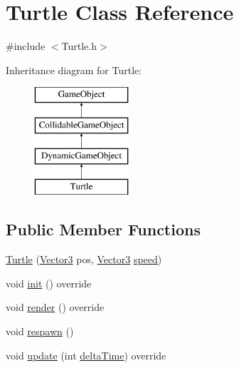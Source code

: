 \hypertarget{class_turtle}{}\section{Turtle Class Reference}
\label{class_turtle}


{\ttfamily \#include $<$Turtle.\+h$>$}

Inheritance diagram for Turtle\+:\begin{figure}[H]
\begin{center}
\leavevmode
\includegraphics[height=4.000000cm]{class_turtle}
\end{center}
\end{figure}
\subsection*{Public Member Functions}
\begin{DoxyCompactItemize}
\item 
\hyperlink{class_turtle_a970240e0b41cea58ef93f8f0d3e17fd4}{Turtle} (\hyperlink{class_vector3}{Vector3} pos, \hyperlink{class_vector3}{Vector3} \hyperlink{class_dynamic_game_object_a54cb8a3a5fe8314cd5751f223b2b49ae}{speed})
\item 
void \hyperlink{class_turtle_a6ba4b31af71ea52e0e885a3e3beb783c}{init} () override
\item 
void \hyperlink{class_turtle_a697924198490c52307fdb006f1df7456}{render} () override
\item 
void \hyperlink{class_turtle_a6c70cb2158f173b82df6620905ad435c}{respawn} ()
\item 
void \hyperlink{class_turtle_a6d62e3f4e21f5ce3ffb4e7e2a8a9da1b}{update} (int \hyperlink{_game_manager_8h_afea6a95c7a1c119b7106a4c735eb259d}{delta\+Time}) override
\end{DoxyCompactItemize}

